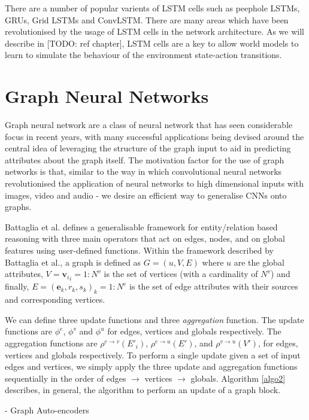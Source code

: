 There are a number of popular varients of LSTM cells such as peephole LSTMs, GRUs, Grid LSTMs and ConvLSTM. There are many areas which have been revolutionised by the usage of LSTM cells in the network architecture. As we will describe in [TODO: ref chapter], LSTM cells are a key to allow world models to learn to simulate the behaviour of the environment state-action transitions.

\section{Graph Neural Networks}

Graph neural network are a class of neural network that has seen considerable focus in recent years, with many successful applications being devised around the central idea of leveraging the structure of the graph input to aid in predicting attributes about the graph itself. The motivation factor for the use of graph networks is that, similar to the way in which convolutional neural networks revolutionised the application of neural networks to high dimensional inputs with images, video and audio - we desire an efficient way to generalise CNNs onto graphs.

Battaglia et al. \cite{battaglia2018relational} defines a generalisable framework for entity/relation based reasoning with three main operators that act on edges, nodes, and on global features using user-defined functions. Within the framework described by Battaglia et al., a graph is defined as $G = (u, V, E)$ where $u$ are the global attributes, $V = {\mathbf{v}_i}_i={1:N^v}$ is the set of vertices (with a cardinality of $N^v$) and finally, $E = {(\mathbf{e}_k, r_k, s_k)}_k={1:N^e}$ is the set of edge attributes with their sources and corresponding vertices.



We can define three update functions and three \textit{aggregation} function. The update functions are $\phi^e$, $\phi^v$ and $\phi^u$ for edges, vertices and globals respectively. The aggregation functions are $\rho^{e \rightarrow v} (E'_i)$, $\rho^{e \rightarrow u} (E')$, and $\rho^{v \rightarrow u} (V')$, for edges, vertices and globals respectively. To perform a single update given a set of input edges and vertices, we simply apply the three update and aggregation functions sequentially in the order of edges $\rightarrow$ vertices $\rightarrow$ globals. Algorithm \ref{algo2} describes, in general, the algorithm to perform an update of a graph block.

- Graph Auto-encoders


